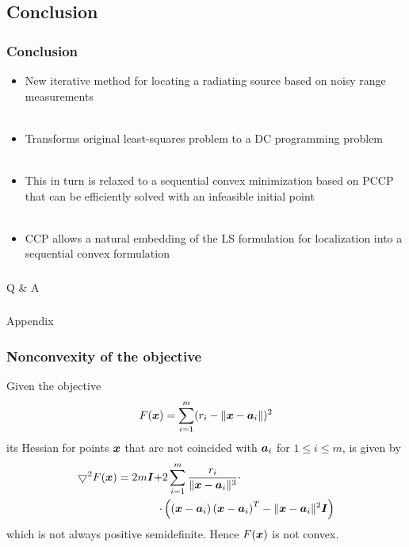 \documentclass [t] {beamer} %
\begin{document}
\subsection{Conclusion} 

\begin{frame}
\frametitle{Conclusion} 
\phantom{m}
\begin{itemize}
\item
New iterative method for locating a radiating source based on noisy range measurements
\\~\\
\item
Transforms original least-squares problem to a DC programming problem
\\~\\
\item
This in turn is relaxed to a sequential convex minimization based on PCCP that can be efficiently solved with an infeasible initial point
\\~\\
\item
CCP allows a natural embedding of the LS formulation for localization into a sequential convex formulation
\end{itemize}
\end{frame}


\begin{frame} [noframenumbering]
\frametitle{  }
\phantom{m} 
\phantom{m}
\phantom{m} 
\phantom{m}
\phantom{m} 
\phantom{m}
\Huge{\centerline{Q \& A }}

\end{frame}

%
\appendix
\begin{frame} [noframenumbering]
\frametitle{  }
\phantom{m} 
\phantom{m}
\phantom{m} 
\phantom{m}
\phantom{m} 
\phantom{m}
\Huge{\centerline{Appendix}}
\end{frame}

\begin{frame}
\frametitle{Nonconvexity of the objective}
\phantom{m}
\linespread{0.1} \selectfont
Given the objective
\begin{equation}
 F(\mbox{\boldmath$x$})= \sum_{i=1}^{m} (r_i - \|{\mbox{\boldmath$x$}} - {\mbox{\boldmath$a$}}_i\|)^2 \nonumber
\end{equation}
\linespread{1}\selectfont
its Hessian for points $\mbox{\boldmath$x$}$ that are not coincided with $\mbox{\boldmath$a$}_i$ for $1 \leq i \leq m$, is given by
\begin{equation}
\begin{aligned}
\nonumber
\bigtriangledown ^2 F(\mbox{\boldmath$x$})  = 2m\mbox{\boldmath$I$}  + &2\sum^m_{i=1} \frac{r_i}{\|\mbox{\boldmath$x$} - \mbox{\boldmath$a$}_i\|^3} \cdot \\
\cdot &\left( \left(\mbox{\boldmath$x$} - \mbox{\boldmath$a$}_i\right)\left(\mbox{\boldmath$x$} - \mbox{\boldmath$a$}_i\right)^T - \|\mbox{\boldmath$x$} - \mbox{\boldmath$a$}_i\|^2 \mbox{\boldmath$I$} \right)
\end{aligned}
\end{equation}
which is not always positive semidefinite. Hence $F(\mbox{\boldmath$x$})$ is not convex.
\end{frame}
\end{document}
